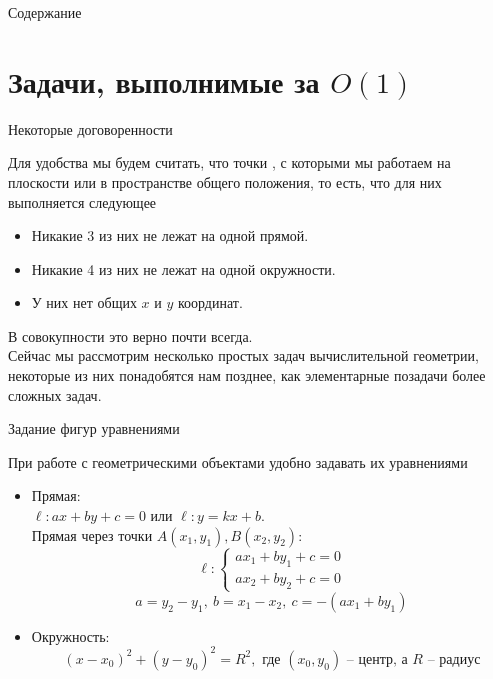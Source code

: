 \documentclass[12pt,aspectratio=169,svgnames]{beamer}
\begin{document}
 \maketitle

\begin{frame}{Содержание}
	\tableofcontents
\end{frame}

\section{Задачи, выполнимые за $O(1)$}
\begin{frame}{Некоторые договоренности}

	Для удобства мы будем считать, что точки , с которыми мы работаем на плоскости или в пространстве
	\alert{общего положения}, то есть, что для них выполняется следующее

	\begin{itemize}
		\item Никакие 3 из них не лежат на одной прямой.

		\item Никакие 4 из них не лежат на одной окружности.

		\item У них нет общих $x$ и $y$ координат.
	\end{itemize}

	В совокупности это верно почти всегда.\\

	Сейчас мы рассмотрим несколько простых задач вычислительной геометрии, некоторые из них понадобятся нам позднее, как
	элементарные позадачи более сложных задач.

\end{frame}

\begin{frame}{Задание фигур уравнениями}

	При работе с геометрическими объектами удобно задавать их уравнениями

		\begin{itemize}
			\item Прямая:\\

			$\ell\colon ax + by + c = 0$ или $\ell\colon y = kx + b$.\\
			Прямая через точки $A(x_1, y_1), B(x_2, y_2)$:
			\[ \ell\colon \begin{cases} ax_1 + by_1 + c = 0 \\ ax_2 + by_2 + c = 0 \end{cases}\]
			\[ a = y_2 - y_1, \ b = x_1 - x_2, \ c = -(ax_1 + by_1)\]

			\item Окружность:
			\[ (x - x_0)^2 + (y - y_0)^2 = R^2, \text{ где } (x_0, y_0) \text{ -- центр, а } R \text{ -- радиус} \]
		\end{itemize}

\end{frame}
\end{document}
